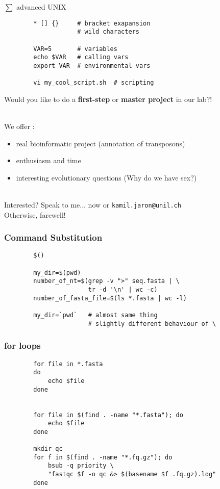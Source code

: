 \documentclass[xcolor=dvipsnames]{beamer}
\begin{document}
\begin{frame}[fragile]
	\Huge
	$\sum$ advanced UNIX
	\Large
	\begin{verbatim}
		* [] {}     # bracket exapansion
		            # wild characters

		VAR=5       # variables
		echo $VAR   # calling vars
		export VAR  # environmental vars

		vi my_cool_script.sh  # scripting
	\end{verbatim}
\end{frame}

\begin{frame}[fragile]
	\begin{center}
		\Large
		Would you like to do a \textbf{first-step} or \textbf{master project} in our lab?!\\
	\end{center}
	~\\
	We offer :
		\begin{itemize}
			\item real bioinformatic project (annotation of transposons)
			\item enthusiasm and time
			\item interesting evolutionary questions (Why do we have sex?)
		\end{itemize}
	~\\
	Interested? Speak to me... now or \verb!kamil.jaron@unil.ch!
	~\\
	Otherwise, farewell!
\end{frame}

\begin{frame}[fragile]
	\frametitle{Command Substitution}
	\begin{verbatim}
		$()

		my_dir=$(pwd)
		number_of_nt=$(grep -v ">" seq.fasta | \
		               tr -d '\n' | wc -c)
		number_of_fasta_file=$(ls *.fasta | wc -l)

		my_dir=`pwd`   # almost same thing
		               # slightly different behaviour of \
	\end{verbatim}
\end{frame}

\begin{frame}[fragile]
	\frametitle{for loops}
	\begin{verbatim}
		for file in *.fasta
		do
		    echo $file
		done


		for file in $(find . -name "*.fasta"); do
		    echo $file
		done

		mkdir qc
		for f in $(find . -name "*.fq.gz"); do
		    bsub -q priority \
		    "fastqc $f -o qc &> $(basename $f .fq.gz).log"
		done
	\end{verbatim}
\end{frame}
\end{document}
